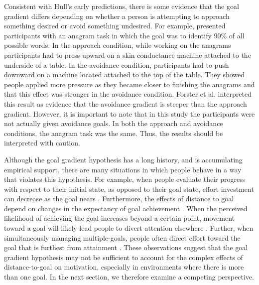 \documentclass[a4paper,doc,natbib,donotrepeattitle]{apa6}
\begin{document}
Consistent with Hull's early predictions, there is some evidence that the goal gradient differs depending on whether a person is attempting to approach something desired or avoid something undesired. For example, \cite{Forster1998} presented participants with an anagram task in which the goal was to identify 90\% of all possible words. In the approach condition, while working on the anagrams participants had to press upward on a skin conductance machine attached to the underside of a table. In the avoidance condition, participants had to push downward on a machine located attached to the top of the table.
They showed people applied more pressure as they became closer to finishing the anagrams and that this effect was stronger in the avoidance condition. Forster et al. interpreted this result as evidence that the avoidance gradient is steeper than the approach gradient. However, it is important to note that in this study the participants were not actually given avoidance goals. In both the approach and avoidance conditions, the anagram task was the same. Thus, the results should be interpreted with caution.


Although the goal gradient hypothesis has a long history, and is accumulating empirical support, there are many situations in which people behave in a way that violates this hypothesis. For example, when people evaluate their progress with respect to their initial state, as opposed to their goal state, effort investment can decrease as the goal nears \citep{Bonezzi2011}. Furthermore, the effects of distance to goal depend on changes in the expectancy of goal achievement \citep{Liberman2008}. When the perceived likelihood of achieving the goal increases beyond a certain point, movement toward a goal will likely lead people to divert attention elsewhere \citep{Louro2007}.
Further, when simultaneously managing multiple-goals, people often direct effort toward the goal that is furthest from attainment \citep{Schmidt2007,Ballard2017}. These observations suggest that the goal gradient hypothesis may not be sufficient to account for the complex effects of distance-to-goal on motivation, especially in environments where there is more than one goal.
In the next section, we therefore examine a competing perspective.
\end{document}
